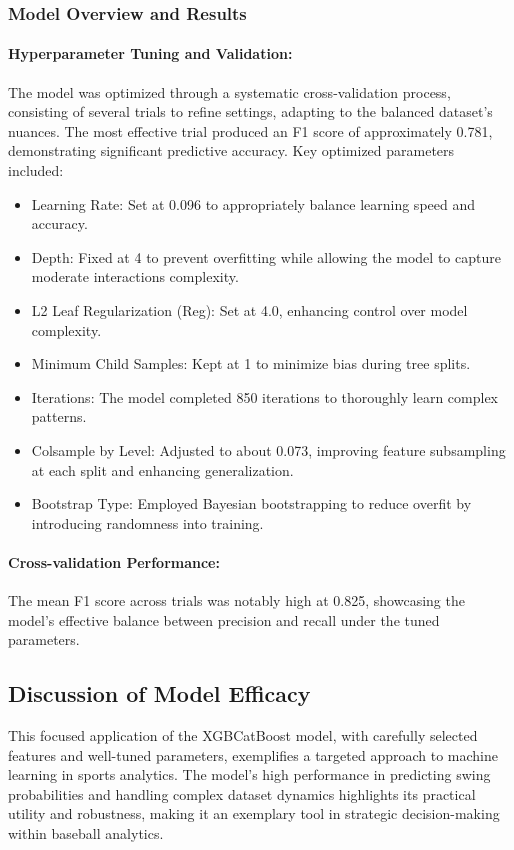 \documentclass[12pt]{article}
\begin{document}
\subsubsection*{Model Overview and Results}
\paragraph{Hyperparameter Tuning and Validation:}
The model was optimized through a systematic cross-validation process, consisting of several trials to refine settings, adapting to the balanced dataset's nuances. The most effective trial produced an F1 score of approximately 0.781, demonstrating significant predictive accuracy. Key optimized parameters included:
\begin{itemize}
    \item Learning Rate: Set at 0.096 to appropriately balance learning speed and accuracy.
    \item Depth: Fixed at 4 to prevent overfitting while allowing the model to capture moderate interactions complexity.
    \item L2 Leaf Regularization (Reg): Set at 4.0, enhancing control over model complexity.
    \item Minimum Child Samples: Kept at 1 to minimize bias during tree splits.
    \item Iterations: The model completed 850 iterations to thoroughly learn complex patterns.
    \item Colsample by Level: Adjusted to about 0.073, improving feature subsampling at each split and enhancing generalization.
    \item Bootstrap Type: Employed Bayesian bootstrapping to reduce overfit by introducing randomness into training.
\end{itemize}

\paragraph{Cross-validation Performance:}
The mean F1 score across trials was notably high at 0.825, showcasing the model's effective balance between precision and recall under the tuned parameters.

\subsection*{Discussion of Model Efficacy}
This focused application of the XGBCatBoost model, with carefully selected features and well-tuned parameters, exemplifies a targeted approach to machine learning in sports analytics. The model's high performance in predicting swing probabilities and handling complex dataset dynamics highlights its practical utility and robustness, making it an exemplary tool in strategic decision-making within baseball analytics.
\end{document}
